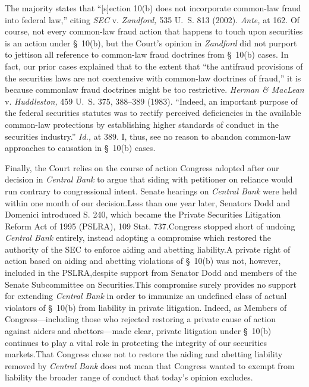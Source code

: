   The majority states that ``[s]ection 10(b) does not incorporate common-law fraud into federal law,'' citing \emph{SEC} v. \emph{Zandford,} 535 U.~S. 813 (2002). \emph{Ante,} at 162. Of course, not every common-law fraud action that happens to touch upon securities is an action under \S~10(b), but the Court's opinion in \emph{Zandford} did not purport to jettison all reference to common-law fraud doctrines from \S~10(b) cases. In fact, our prior cases explained that to the extent that ``the antifraud provisions of the securities laws are not coextensive with common-law doctrines of fraud,'' it is because commonlaw fraud doctrines might be too restrictive. \emph{Herman \& MacLean} v. \emph{Huddleston,} 459 U.~S. 375, 388--389 (1983). ``Indeed, an important purpose of the federal securities statutes was to rectify perceived deficiencies in the available common-law protections by establishing higher standards of conduct in the securities industry.'' \emph{Id.,} at 389. I, thus, see no reason to abandon common-law approaches to causation in \S~10(b) cases.

  Finally, the Court relies on the course of action Congress adopted after our decision in \emph{Central Bank} to argue that siding with petitioner on reliance would run contrary to congressional intent. Senate hearings on \emph{Central Bank} were held within one month of our decision.\footnotemark[5] Less than one year later, Senators Dodd and Domenici introduced S. 240, which became the Private Securities Litigation Reform Act of 1995 (PSLRA), 109 Stat. 737.\footnotemark[6] Congress stopped short of undoing \emph{Central Bank} entirely, instead adopting a compromise which restored the authority of the SEC to enforce aiding and abetting liability.\footnotemark[7] A private right of action based on \newpage  aiding and abetting violations of \S~10(b) was not, however, included in the PSLRA,\footnotemark[8] despite support from Senator Dodd and members of the Senate Subcommittee on Securities.\footnotemark[9] This compromise surely provides no support for extending \emph{Central Bank} in order to immunize an undefined class of actual violators of \S~10(b) from liability in private litigation. Indeed, as Members of Congress---including those who rejected restoring a private cause of action against aiders and abettors---made clear, private litigation under \S~10(b) continues to play a vital role in protecting the integrity of our securities markets.\footnotemark[10] That Congress chose not to restore \newpage  the aiding and abetting liability removed by \emph{Central Bank} does not mean that Congress wanted to exempt from liability the broader range of conduct that today's opinion excludes.

